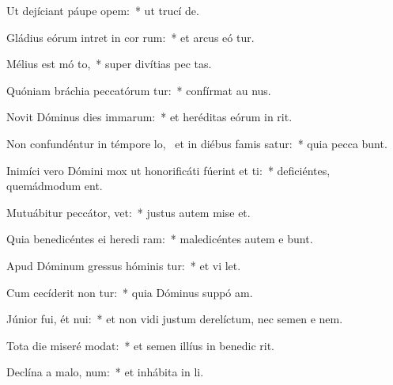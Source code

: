 \item Ut dejíciant páupe  opem:~* ut trucí  de.
\item Gládius eórum intret in cor rum:~* et arcus eó tur.
\item Mélius est mó to,~* super divítias pec tas.
\item Quóniam bráchia peccatórum tur:~* confírmat au  nus.
\item Novit Dóminus dies immarum:~* et heréditas eórum in  rit.
\item Non confundéntur in témpore lo,~\pscross{} et in diébus famis satur:~* quia pecca bunt.
\item Inimíci vero Dómini mox ut honorificáti fúerint et ti:~* deficiéntes, quemádmodum  ent.
\item Mutuábitur peccátor,   vet:~* justus autem mise  et.
\item Quia benedicéntes ei heredi ram:~* maledicéntes autem e bunt.
\item Apud Dóminum gressus hóminis tur:~* et vi  let.
\item Cum cecíderit non tur:~* quia Dóminus suppó  am.
\item Júnior fui, ét nui:~* et non vidi justum derelíctum, nec semen e  nem.
\item Tota die miseré  modat:~* et semen illíus in benedic rit.
\item Declína a malo,   num:~* et inhábita in  li.
